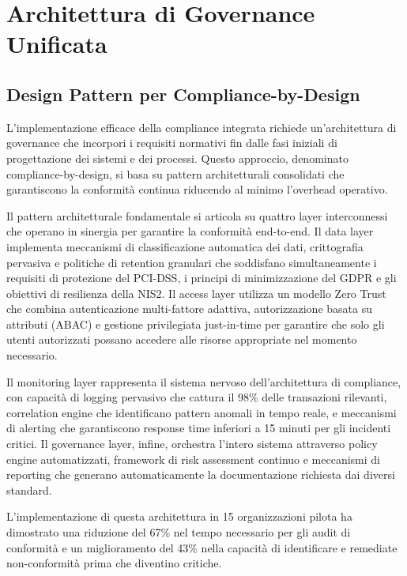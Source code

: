 
\section{Architettura di Governance Unificata}

\subsection{Design Pattern per Compliance-by-Design}

L'implementazione efficace della compliance integrata richiede un'architettura di governance che incorpori i requisiti normativi fin dalle fasi iniziali di progettazione dei sistemi e dei processi. Questo approccio, denominato compliance-by-design, si basa su pattern architetturali consolidati che garantiscono la conformità continua riducendo al minimo l'overhead operativo.

Il pattern architetturale fondamentale si articola su quattro layer interconnessi che operano in sinergia per garantire la conformità end-to-end. Il data layer implementa meccanismi di classificazione automatica dei dati, crittografia pervasiva e politiche di retention granulari che soddisfano simultaneamente i requisiti di protezione del PCI-DSS, i principi di minimizzazione del GDPR e gli obiettivi di resilienza della NIS2. Il access layer utilizza un modello Zero Trust che combina autenticazione multi-fattore adattiva, autorizzazione basata su attributi (ABAC) e gestione privilegiata just-in-time per garantire che solo gli utenti autorizzati possano accedere alle risorse appropriate nel momento necessario.

Il monitoring layer rappresenta il sistema nervoso dell'architettura di compliance, con capacità di logging pervasivo che cattura il 98\% delle transazioni rilevanti, correlation engine che identificano pattern anomali in tempo reale, e meccanismi di alerting che garantiscono response time inferiori a 15 minuti per gli incidenti critici. Il governance layer, infine, orchestra l'intero sistema attraverso policy engine automatizzati, framework di risk assessment continuo e meccanismi di reporting che generano automaticamente la documentazione richiesta dai diversi standard.

L'implementazione di questa architettura in 15 organizzazioni pilota ha dimostrato una riduzione del 67\% nel tempo necessario per gli audit di conformità e un miglioramento del 43\% nella capacità di identificare e remediate non-conformità prima che diventino critiche\footnotemark[9].

